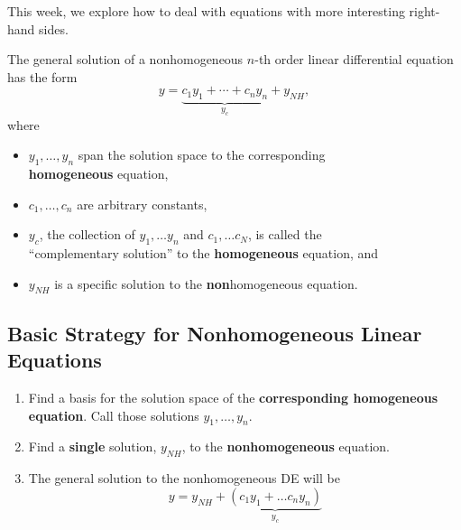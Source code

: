 This week, we explore how to deal with equations with more interesting
right-hand sides.




\vfill

\newpage

  The general solution of a nonhomogeneous $n$-th order linear differential
  equation has the form $$y = \underbrace{c_1 y_1 + \dotsb + c_n y_n}_{y_c} + y_{NH},$$
 where 
\begin{itemize}
\item $y_1, \dotsc, y_n$ span the solution space to the corresponding \\{\bf homogeneous} equation, 
\item $c_1, \dotsc, c_n$ are arbitrary constants,
\item $y_c$, the collection of $y_1, \ldots y_n$ and $c_1, \ldots
  c_N$, is called the \\``complementary solution'' to the {\bf homogeneous} equation, and
\item $y_{NH}$ is a specific solution to the {\bf non}homogeneous equation.
\end{itemize}

\newpage

\subsection*{Basic Strategy for Nonhomogeneous Linear Equations}
\begin{enumerate}
\item Find a basis for the solution space of the {\bf corresponding homogeneous
  equation}.  Call those solutions $y_1, \ldots, y_n$. \\[2ex]
\item Find a {\bf single} solution, $y_{NH}$,  to the {\bf nonhomogeneous} equation. \\[2ex]
\item The general solution to the nonhomogeneous DE will be $$y = y_{NH} + \underbrace{\left(c_1 y_1 + \ldots c_n y_n\right)}_{y_c}$$
\end{enumerate}

